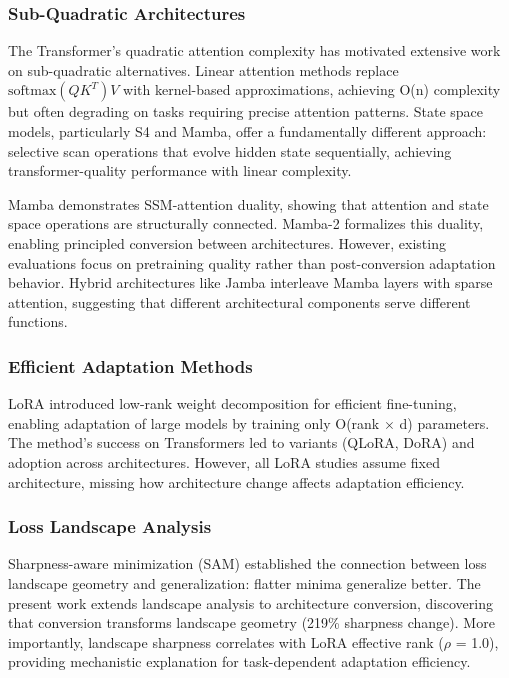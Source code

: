 
\subsubsection{Sub-Quadratic Architectures}

The Transformer's quadratic attention complexity has motivated extensive work on sub-quadratic alternatives. Linear attention methods replace $\text{softmax}(QK^T)V$ with kernel-based approximations, achieving O(n) complexity but often degrading on tasks requiring precise attention patterns. State space models, particularly S4 and Mamba, offer a fundamentally different approach: selective scan operations that evolve hidden state sequentially, achieving transformer-quality performance with linear complexity.

Mamba demonstrates SSM-attention duality, showing that attention and state space operations are structurally connected. Mamba-2 formalizes this duality, enabling principled conversion between architectures. However, existing evaluations focus on pretraining quality rather than post-conversion adaptation behavior. Hybrid architectures like Jamba interleave Mamba layers with sparse attention, suggesting that different architectural components serve different functions.

\subsubsection{Efficient Adaptation Methods}

LoRA introduced low-rank weight decomposition for efficient fine-tuning, enabling adaptation of large models by training only O(rank $\times$ d) parameters. The method's success on Transformers led to variants (QLoRA, DoRA) and adoption across architectures. However, all LoRA studies assume fixed architecture, missing how architecture change affects adaptation efficiency.

\subsubsection{Loss Landscape Analysis}

Sharpness-aware minimization (SAM) established the connection between loss landscape geometry and generalization: flatter minima generalize better. The present work extends landscape analysis to architecture conversion, discovering that conversion transforms landscape geometry (219\% sharpness change). More importantly, landscape sharpness correlates with LoRA effective rank ($\rho$ = 1.0), providing mechanistic explanation for task-dependent adaptation efficiency.
